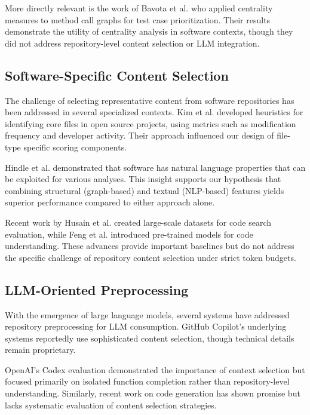 \documentclass[conference]{IEEEtran}
\begin{document}
More directly relevant is the work of Bavota et al. \cite{bavota2013methodbook} who applied centrality measures to method call graphs for test case prioritization. Their results demonstrate the utility of centrality analysis in software contexts, though they did not address repository-level content selection or LLM integration.

\subsection{Software-Specific Content Selection}

The challenge of selecting representative content from software repositories has been addressed in several specialized contexts. Kim et al. \cite{kim2013classifying} developed heuristics for identifying core files in open source projects, using metrics such as modification frequency and developer activity. Their approach influenced our design of file-type specific scoring components.

Hindle et al. \cite{hindle2016naturalness} demonstrated that software has natural language properties that can be exploited for various analyses. This insight supports our hypothesis that combining structural (graph-based) and textual (NLP-based) features yields superior performance compared to either approach alone.

Recent work by Husain et al. \cite{husain2019codesearchnet} created large-scale datasets for code search evaluation, while Feng et al. \cite{feng2020codebert} introduced pre-trained models for code understanding. These advances provide important baselines but do not address the specific challenge of repository content selection under strict token budgets.

\subsection{LLM-Oriented Preprocessing}

With the emergence of large language models, several systems have addressed repository preprocessing for LLM consumption. GitHub Copilot's underlying systems \cite{chen2021evaluating} reportedly use sophisticated content selection, though technical details remain proprietary. 

OpenAI's Codex evaluation \cite{chen2021evaluating} demonstrated the importance of context selection but focused primarily on isolated function completion rather than repository-level understanding. Similarly, recent work on code generation \cite{nijkamp2022codegen} has shown promise but lacks systematic evaluation of content selection strategies.
\end{document}
